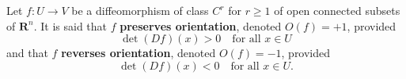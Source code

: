 Let $f: U \to V$ be a diffeomorphism of class $C^r$ for $r \geq 1$ of open connected subsets of $\mathbf{R}^n$. It is said that $f$ \textbf{preserves orientation}, denoted $O(f) = +1$, provided
$$\det(Df)(x) > 0 \quad \text{for all } x \in U$$
and that $f$ \textbf{reverses orientation}, denoted $O(f) = -1$, provided
$$\det(Df)(x) < 0 \quad \text{for all } x \in U.$$
